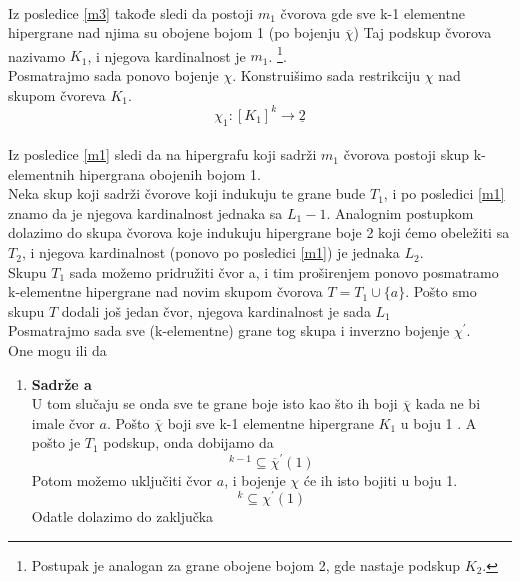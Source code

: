 \documentclass[a4paper]{article}
\begin{document}
\begin{description}
\begin{equation}
		\end{equation}
		\\
		Iz posledice \ref{m3} takođe sledi da postoji $m_1$ čvorova gde sve k-1 elementne hipergrane nad njima su obojene bojom 1 (po bojenju $\overline{\chi}$)
		Taj podskup čvorova nazivamo $K_1$, i njegova kardinalnost je  $m_1$. \footnote{Postupak je analogan za grane obojene bojom 2, gde nastaje podskup $K_2$.}. \\
		Posmatrajmo sada ponovo bojenje $\chi$. Konstruišimo sada restrikciju $\chi$ nad  skupom čvoreva $K_1$.
		\begin{equation}
			\chi_1 : [ K_1 ]^k  \rightarrow \underline{2}
		\end{equation}\\
		Iz posledice \ref{m1} sledi da na hipergrafu koji sadrži $m_1$ čvorova postoji skup k-elementnih hipergrana obojenih bojom 1.\\ Neka skup koji sadrži čvorove koji indukuju te grane bude $T_1$, i po posledici \ref{m1} znamo da je njegova kardinalnost jednaka sa $L_1 - 1$. Analognim postupkom dolazimo do  skupa čvorova koje indukuju hipergrane boje 2 koji ćemo obeležiti sa $T_2$, i njegova kardinalnost (ponovo po posledici \ref{m1}) je jednaka $L_2$. \\
		Skupu $T_1$ sada možemo pridružiti čvor a, i tim proširenjem ponovo posmatramo k-elementne hipergrane nad novim skupom čvorova $T = T_1 \cup \{a\}$. Pošto smo skupu $T$ dodali još jedan čvor, njegova kardinalnost je sada $L_1$\\
		Posmatrajmo sada sve (k-elementne) grane tog skupa i inverzno bojenje $\chi^\prime$.\\
		One mogu ili da 
		\begin{enumerate}
			\item \textbf{Sadrže a}\\
				U tom slučaju se onda sve te grane boje isto kao što ih boji $\overline{\chi}$ kada ne bi imale čvor $a$. Pošto $\overline{\chi}$ boji sve k-1 elementne hipergrane $K_1$ u boju 1 . A pošto je $T_1$ podskup, onda dobijamo da 
				\begin{equation}
					[ T_1 ]^{k-1} \subseteq \overline{\chi}^\prime (1)
				\end{equation}
				Potom možemo uključiti čvor $a$, i bojenje $\chi$ će ih isto bojiti u boju 1.
				\begin{equation}
					[ T_1 \cup \{a\} ]^{k} \subseteq \chi^\prime (1)
				\end{equation}
				Odatle dolazimo do zaključka 
				\begin{equation}

\end{equation}
\end{enumerate}
\end{description}
\end{document}
